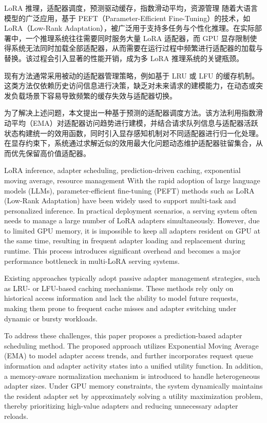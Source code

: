 \begin{中文摘要}{LoRA 推理，适配器调度，预测驱动缓存，指数滑动平均，资源管理}
随着大语言模型的广泛应用，基于 PEFT（Parameter-Efficient Fine-Tuning）的技术，如 LoRA（Low-Rank Adaptation），被广泛用于支持多任务与个性化推理。在实际部署中，一个推理系统往往需要同时服务大量 LoRA 适配器，而 GPU 显存限制使得系统无法同时加载全部适配器，从而需要在运行过程中频繁进行适配器的加载与替换。该过程会引入显著的性能开销，成为多 LoRA 推理系统的关键瓶颈。

现有方法通常采用被动的适配器管理策略，例如基于 LRU 或 LFU 的缓存机制。这类方法仅依赖历史访问信息进行决策，缺乏对未来请求的建模能力，在动态或突发负载场景下容易导致频繁的缓存失效与适配器切换。

为了解决上述问题，本文提出一种基于预测的适配器调度方法。该方法利用指数滑动平均（EMA）对适配器访问趋势进行建模，并结合请求队列信息与适配器活跃状态构建统一的效用函数，同时引入显存感知机制对不同适配器进行归一化处理。在显存约束下，系统通过求解近似的效用最大化问题动态维护适配器驻留集合，从而优先保留高价值适配器。
\end{中文摘要}

\begin{英文摘要}{LoRA inference, adapter scheduling, prediction-driven caching, exponential moving average, resource management}
With the rapid adoption of large language models (LLMs), parameter-efficient fine-tuning (PEFT) methods such as LoRA (Low-Rank Adaptation) have been widely used to support multi-task and personalized inference. In practical deployment scenarios, a serving system often needs to manage a large number of LoRA adapters simultaneously. However, due to limited GPU memory, it is impossible to keep all adapters resident on GPU at the same time, resulting in frequent adapter loading and replacement during runtime. This process introduces significant overhead and becomes a major performance bottleneck in multi-LoRA serving systems.

Existing approaches typically adopt passive adapter management strategies, such as LRU- or LFU-based caching mechanisms. These methods rely only on historical access information and lack the ability to model future requests, making them prone to frequent cache misses and adapter switching under dynamic or bursty workloads.

To address these challenges, this paper proposes a prediction-based adapter scheduling method. The proposed approach utilizes Exponential Moving Average (EMA) to model adapter access trends, and further incorporates request queue information and adapter activity states into a unified utility function. In addition, a memory-aware normalization mechanism is introduced to handle heterogeneous adapter sizes. Under GPU memory constraints, the system dynamically maintains the resident adapter set by approximately solving a utility maximization problem, thereby prioritizing high-value adapters and reducing unnecessary adapter reloads.
\end{英文摘要}
\cleardoublepage
